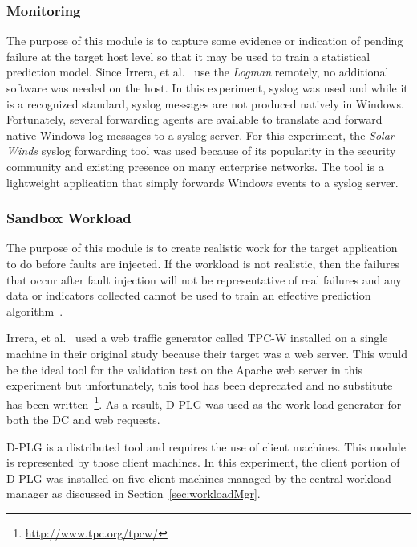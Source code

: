 \subsubsection{Monitoring} \label{sec:sandboxMonitoringTool} 
The purpose of this module is to capture some evidence or indication of pending
failure at the target host level so that it may be used to train a statistical
prediction model.  Since Irrera, et al.~\cite{irrera2015} use the \emph{Logman}
remotely, no additional software was needed on the host.  In this experiment,
syslog was used and while it is a recognized standard, syslog messages are not
produced natively in Windows.  Fortunately, several forwarding agents are
available to translate and forward native Windows log messages to a syslog
server.  For this experiment, the \emph{Solar Winds} syslog forwarding tool was
used because of its popularity in the security community and existing presence
on many enterprise networks.  The tool is a lightweight application that simply
forwards Windows events to a syslog server.

\subsubsection{Sandbox Workload}  \label{sec:sandboxWorkload} 
The purpose of this module is to create realistic work for the target
application to do before faults are injected.  If the workload is not
realistic, then the failures that occur after fault injection will not be
representative of real failures and any data or indicators collected cannot be
used to train an effective prediction
algorithm~\cite{cotroneo2012,irrera2015,kikuchi2014}.

Irrera, et al.~\cite{irrera2015} used a web traffic generator called TPC-W
installed on a single machine in their original study because their target was
a web server.  This would be the ideal tool for the validation test on the
Apache web server in this experiment but unfortunately, this tool has been
deprecated and no substitute has been
written~\footnote{\url{http://www.tpc.org/tpcw/}}.  As a result, \ac{D-PLG} was
used as the work load generator for both the \ac{DC} and web requests.

\ac{D-PLG} is a distributed tool and requires the use of client machines.  This
module is represented by those client machines.  In this experiment, the client
portion of \ac{D-PLG} was installed on five client machines managed by the
central workload manager as discussed in Section~\ref{sec:workloadMgr}.


